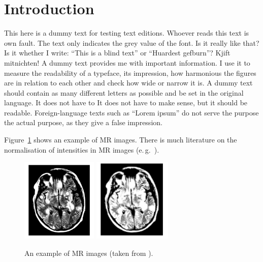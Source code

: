 
\section{Introduction}%
\label{sec:introduction}

This here is a dummy text for testing text editions. Whoever reads this text is
own fault. The text only indicates the grey value of the font. Is it really like that? Is it
whether I write: ``This is a blind text'' or ``Huardest gefburn''? Kjift mitnichten! A dummy text provides me with important information. I use it to measure the readability 
of a typeface, its impression, how harmonious the figures are in relation to each other
and check how wide or narrow it is. A dummy text should contain as many different 
letters as possible and be set in the original language. It does not have to
It does not have to make sense, but it should be readable. Foreign-language texts such as ``Lorem ipsum'' do not serve the purpose 
the actual purpose, as they give a false impression.


Figure~\ref{fig:mri} shows an example of MR images. There is much literature on the normalisation
of intensities in MR images (e.\,g.~\cite{Jaeger09}). 


\begin{figure}[h]
\centering
\includegraphics[height=4cm]{Figures/jaeger1.png}
\includegraphics[height=4cm]{Figures/jaeger2.png}
\caption{An example of MR images (taken from \cite{Jaeger09}).}%
\label{fig:mri}
\end{figure}
